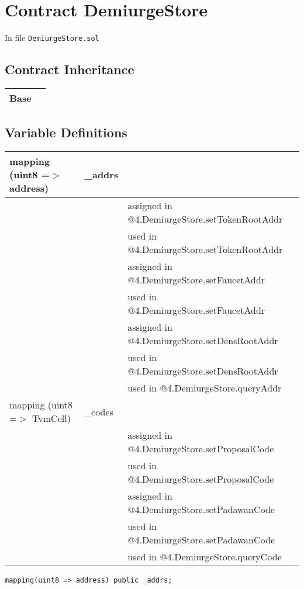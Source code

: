 
\chapter{Contract DemiurgeStore}

\minitoc

In file {\tt DemiurgeStore.sol}

\section{Contract Inheritance}


\noindent\begin{tabular}{|l|p{5cm}|}\hline
Base & \\\hline
\end{tabular}


\section{Variable Definitions}


\ifsoltables
\noindent\begin{tabular}{|l|l|p{5cm}|}\hline
mapping (uint8 =$>$ address) & \_{}addrs &  \\\hline
 & & assigned in @4.DemiurgeStore.setTokenRootAddr\\\hline
 & & used in @4.DemiurgeStore.setTokenRootAddr\\\hline
 & & assigned in @4.DemiurgeStore.setFaucetAddr\\\hline
 & & used in @4.DemiurgeStore.setFaucetAddr\\\hline
 & & assigned in @4.DemiurgeStore.setDensRootAddr\\\hline
 & & used in @4.DemiurgeStore.setDensRootAddr\\\hline
 & & used in @4.DemiurgeStore.queryAddr\\\hline
mapping (uint8 =$>$ TvmCell) & \_{}codes &  \\\hline
 & & assigned in @4.DemiurgeStore.setProposalCode\\\hline
 & & used in @4.DemiurgeStore.setProposalCode\\\hline
 & & assigned in @4.DemiurgeStore.setPadawanCode\\\hline
 & & used in @4.DemiurgeStore.setPadawanCode\\\hline
 & & used in @4.DemiurgeStore.queryCode\\\hline
\end{tabular}
\fi


\begin{lstlisting}[firstnumber=11]
    mapping(uint8 => address) public _addrs;
\end{lstlisting}

